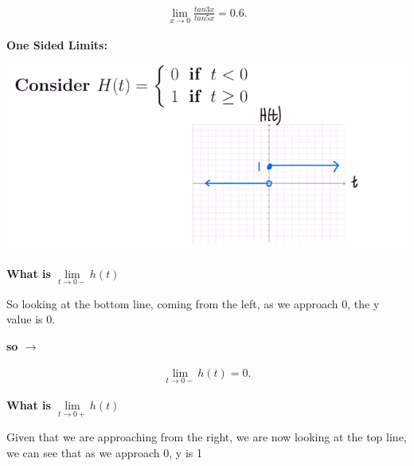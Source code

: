 \documentclass{report}
\begin{document}
    \begin{large}
        \begin{align*}
            \lim\limits_{x \to0 }{ \frac{tan3x}{tan5x} = 0.6}
        .\end{align*}
    \end{large}

    \pagebreak
    \begin{large}
        \noindent \textbf{One Sided Limits:}
    \end{large}
   
    
    \bigbreak \noindent 
    \begin{center}
        \includegraphics[scale=0.5]{../images/ht.png} 
    \end{center}

    \bigbreak \noindent \bigbreak \noindent 
    \bigbreak \noindent 
    \textbf{What is $\lim\limits_{t \to 0- }{h \left(t\right)}$}

    \bigbreak \noindent 
    So looking at the bottom line, coming from the left, as we approach 0, the y value is 
    0.

    \bigbreak \noindent 
    \textbf{so $\rightarrow$}

    \begin{align*}
        \lim\limits_{t \to 0- }{h \left(t\right) = 0}
    .\end{align*}


    \bigbreak \noindent 
    \textbf{What is $\lim\limits_{t \to 0+}{h \left(t\right)}$} 

    \bigbreak \noindent 
    Given that we are approaching from the right, we are now looking at the top line, 
    we can see that as we approach 0, y is 1
\end{document}

